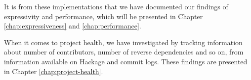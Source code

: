It is from these implementations that we have documented our findings
of expressivity and performance, which will be presented in Chapter
\ref{chap:expressiveness} and \ref{chap:performance}. 

When it comes to project health, we have investigated by tracking
information about number of contributors, number of reverse
dependencies and so on, from information available on Hackage and
commit logs. These findings are presented in Chapter
\ref{chap:project-health}.






